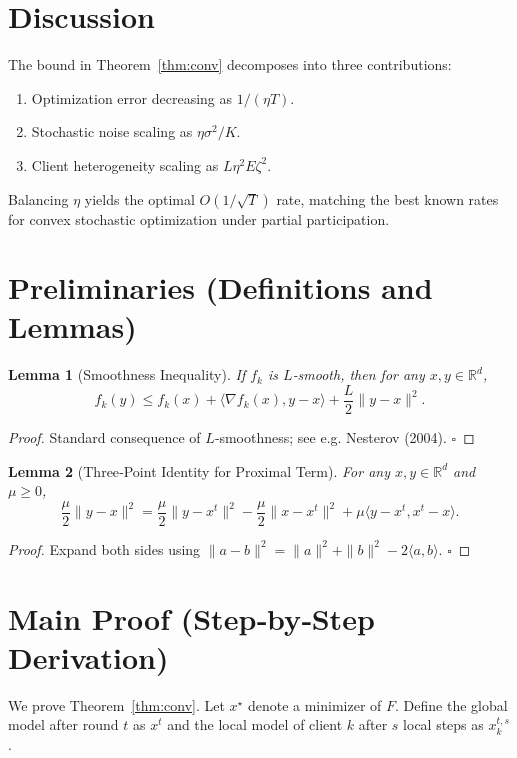 \documentclass[11pt]{article}
\newtheorem{lemma}{Lemma}
\begin{document}
\section*{Discussion}
The bound in Theorem~\ref{thm:conv} decomposes into three contributions:
\begin{enumerate}
    \item Optimization error decreasing as $1/(\eta T)$.
    \item Stochastic noise scaling as $\eta\sigma^{2}/K$.
    \item Client heterogeneity scaling as $L\eta^{2}E\zeta^{2}$.
\end{enumerate}
Balancing $\eta$ yields the optimal $O(1/\sqrt{T})$ rate, matching the best known rates for convex stochastic optimization under partial participation.

\newpage
\section*{Preliminaries (Definitions and Lemmas)}
\begin{lemma}[Smoothness Inequality]\label{lem:smooth}
If $f_k$ is $L$‑smooth, then for any $x,y\in\mathbb{R}^{d}$,
\[
    f_k(y)\le f_k(x)+\langle\nabla f_k(x),y-x\rangle+\frac{L}{2}\|y-x\|^{2}.
\]
\end{lemma}
\begin{proof}
Standard consequence of $L$‑smoothness; see e.g. Nesterov (2004). \hfill$\square$
\end{proof}

\begin{lemma}[Three‑Point Identity for Proximal Term]\label{lem:prox}
For any $x,y\in\mathbb{R}^{d}$ and $\mu\ge0$,
\[
    \frac{\mu}{2}\|y-x\|^{2}
    =\frac{\mu}{2}\|y-x^{t}\|^{2}
     -\frac{\mu}{2}\|x-x^{t}\|^{2}
     +\mu\langle y-x^{t},x^{t}-x\rangle .
\]
\end{lemma}
\begin{proof}
Expand both sides using $\|a-b\|^{2}=\|a\|^{2}+\|b\|^{2}-2\langle a,b\rangle$. \hfill$\square$
\end{proof}

\section*{Main Proof (Step‑by‑Step Derivation)}
We prove Theorem~\ref{thm:conv}. Let $x^{\star}$ denote a minimizer of $F$. Define the global model after round $t$ as $x^{t}$ and the local model of client $k$ after $s$ local steps as $x_{k}^{t,s}$.
\end{document}
